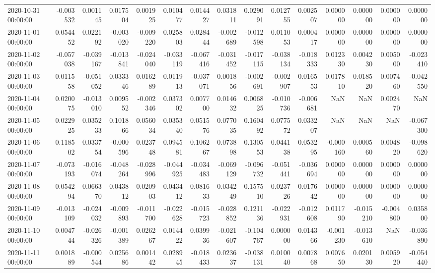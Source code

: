\begin{tabular}{lrrrrrrrrrrrrrr}
2020-10-31 00:00:00 & -0.003532 & 0.001145 & 0.017504 & 0.001925 & 0.010477 & 0.014427 & 0.031811 & 0.029091 & 0.012755 & 0.002507 & 0.000000 & 0.000000 & 0.000000 & 0.000000 \\
2020-11-01 00:00:00 & 0.054452 & 0.022192 & -0.003020 & -0.009220 & 0.025803 & 0.028444 & -0.002689 & -0.012598 & 0.011053 & 0.000417 & 0.000000 & 0.000000 & 0.000000 & 0.000000 \\
2020-11-02 00:00:00 & -0.057038 & -0.039167 & -0.013841 & -0.024040 & -0.033119 & -0.067416 & -0.031452 & -0.017115 & -0.038134 & -0.018333 & 0.012330 & 0.004230 & 0.005000 & -0.023410 \\
2020-11-03 00:00:00 & 0.011558 & -0.051052 & 0.033346 & 0.016289 & 0.011913 & -0.037071 & 0.001856 & -0.002691 & -0.002907 & 0.016553 & 0.017810 & 0.018520 & 0.007460 & -0.042550 \\
2020-11-04 00:00:00 & 0.020075 & -0.013010 & 0.009552 & -0.002346 & 0.037302 & 0.007700 & 0.014632 & 0.006825 & -0.010736 & -0.006681 & NaN & NaN & 0.002470 & NaN \\
2020-11-05 00:00:00 & 0.022925 & 0.035233 & 0.101866 & 0.056034 & 0.035340 & 0.051576 & 0.077035 & 0.160492 & 0.077572 & 0.033207 & NaN & NaN & NaN & -0.067300 \\
2020-11-06 00:00:00 & 0.118502 & 0.033754 & -0.000596 & 0.023748 & 0.094581 & 0.106267 & 0.073898 & 0.130553 & 0.044138 & 0.053295 & -0.000160 & 0.000560 & 0.004820 & -0.098620 \\
2020-11-07 00:00:00 & -0.073193 & -0.016074 & -0.048264 & -0.028996 & -0.044925 & -0.034483 & -0.069129 & -0.096732 & -0.051441 & -0.036694 & 0.000000 & 0.000000 & 0.000000 & 0.000000 \\
2020-11-08 00:00:00 & 0.054294 & 0.066370 & 0.043812 & 0.020903 & 0.043412 & 0.081633 & 0.034249 & 0.157510 & 0.023726 & 0.017642 & 0.000000 & 0.000000 & 0.000000 & 0.000000 \\
2020-11-09 00:00:00 & -0.013109 & -0.024032 & -0.009893 & -0.011700 & -0.022628 & -0.015723 & -0.028852 & 0.121136 & -0.022931 & -0.012608 & 0.011790 & -0.015210 & -0.004800 & 0.035800 \\
2020-11-10 00:00:00 & 0.004744 & -0.026326 & -0.001389 & 0.026267 & 0.014422 & 0.039936 & -0.021607 & -0.104767 & 0.000000 & 0.014366 & -0.001230 & -0.013610 & NaN & -0.036890 \\
2020-11-11 00:00:00 & 0.001889 & -0.000544 & 0.025686 & 0.001442 & 0.028945 & -0.018433 & 0.023637 & -0.038131 & 0.010040 & 0.007868 & 0.007650 & 0.020130 & 0.005920 & -0.054440 \\

\end{tabular}
